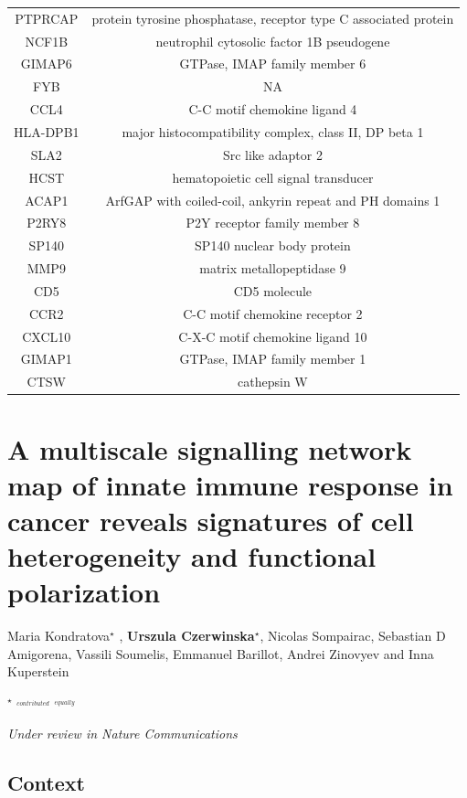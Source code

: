 \documentclass[12pt,]{book}
\theoremstyle{definition}
\theoremstyle{definition}
\theoremstyle{definition}
\theoremstyle{remark}
\begin{document}
\begin{longtable}[t]{cc}
PTPRCAP & protein tyrosine phosphatase, receptor type C associated protein\\
NCF1B & neutrophil cytosolic factor 1B pseudogene\\
\addlinespace
GIMAP6 & GTPase, IMAP family member 6\\
FYB & NA\\
CCL4 & C-C motif chemokine ligand 4\\
HLA-DPB1 & major histocompatibility complex, class II, DP beta 1\\
SLA2 & Src like adaptor 2\\
\addlinespace
HCST & hematopoietic cell signal transducer\\
ACAP1 & ArfGAP with coiled-coil, ankyrin repeat and PH domains 1\\
P2RY8 & P2Y receptor family member 8\\
SP140 & SP140 nuclear body protein\\
MMP9 & matrix metallopeptidase 9\\
\addlinespace
CD5 & CD5 molecule\\
CCR2 & C-C motif chemokine receptor 2\\
CXCL10 & C-X-C motif chemokine ligand 10\\
GIMAP1 & GTPase, IMAP family member 1\\
CTSW & cathepsin W\\*
\end{longtable}






\hypertarget{map}{%
\chapter{A multiscale signalling network map of innate immune response
in cancer reveals signatures of cell heterogeneity and functional
polarization}\label{map}}


Maria Kondratova\(^\star\) , \textbf{Urszula Czerwinska\(^\star\)},
Nicolas Sompairac, Sebastian D Amigorena, Vassili Soumelis, Emmanuel
Barillot, Andrei Zinovyev and Inna Kuperstein

\(^\star\) \(^{_{contributed}}\) \(^{_{equally}}\)

\emph{Under review in Nature Communications}

\hypertarget{context-2}{%
\section{Context}\label{context-2}}
\end{document}
